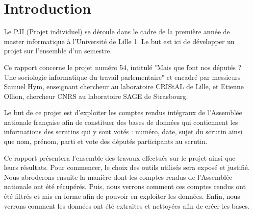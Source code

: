\section*{Introduction}

Le PJI (Projet individuel) se déroule dans le cadre de la première année de master informatique à l'Université de Lille 1. Le but est ici de développer un projet sur l'ensemble d'un semestre.

Ce rapport concerne le projet numéro 54, intitulé "Mais que font nos députés ? Une sociologie informatique du travail parlementaire" et encadré par messieurs Samuel Hym, enseignant chercheur au laboratoire CRIStAL de Lille, et Etienne Ollion, chercheur CNRS au laboratoire SAGE de Strasbourg.

Le but de ce projet est d'exploiter les comptes rendus intégraux de l'Assemblée nationale française afin de constituer des bases de données qui contiennent les informations des scrutins qui y sont votés : numéro, date, sujet du scrutin ainsi que nom, prénom, parti et vote des députés participants au scrutin.

Ce rapport présentera l'ensemble des travaux effectués sur le projet ainsi que leurs résultats. Pour commencer, le choix des outils utilisés sera exposé et justifié. Nous abroderons ensuite la manière dont les comptes rendus de l'Assemblée nationale ont été récupérés. Puis, nous verrons comment ces comptes rendus ont été filtrés et mis en forme afin de pouvoir en exploiter les données. Enfin, nous verrons comment les données ont été extraites et nettoyées afin de créer les bases.
